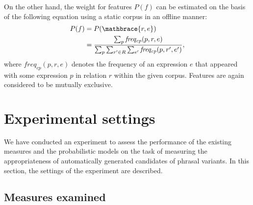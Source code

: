 \documentclass[english]{jnlp_1.4}
\begin{document}
On the other hand, the weight for features $P(f)$ can be estimated on
the basis of the following equation using a static corpus in an
offline manner:
\begin{align*}
  P(f) & = P(\mathbrace{r,e}) \\
	& = \frac{\sum_{p}\mathit{freq_{cp}}(p,r,e)}{\sum_{p}\sum_{r'\in
	    R}\sum_{e'}\mathit{freq_{cp}}(p,r',e')},
\end{align*}
where $\mathit{freq_{cp}}(p,r,e)$ denotes the frequency of an
expression $e$ that appeared with some expression $p$ in relation $r$
within the given corpus.  Features are again considered to be mutually
exclusive.




\section{Experimental settings}
\label{sec:setting}

We have conducted an experiment to assess the performance of the
existing measures and the probabilistic models on the task of
measuring the appropriateness of automatically generated candidates of
phrasal variants.
In this section, the settings of the experiment are described.

\subsection{Measures examined}
\label{ssec:measures}
\end{document}
